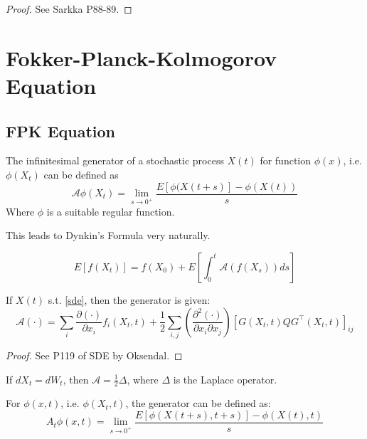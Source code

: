 \begin{proof}
    See Sarkka P88-89.
\end{proof}

\section{Fokker-Planck-Kolmogorov Equation}
\subsection{FPK Equation}
\begin{definition}[Generator]
    The infinitesimal generator of a stochastic process $X(t)$ for function $\phi(x)$, i.e. $\phi(X_t)$ can be defined as
    \begin{equation}
        \mathcal{A} \phi(X_t)=\lim _{s \rightarrow 0^{+}} \frac{E[\phi(X(t+s)]-\phi(X(t))}{s}
    \end{equation}
    Where  $\phi$  is a suitable regular function.
\end{definition}
This leads to Dynkin's Formula very naturally.
\begin{theorem}
    \begin{equation}
        E[f(X_t)]=f(X_0)+E\left[\int_0^t\mathcal{A}(f(X_s))ds\right]
    \end{equation}
\end{theorem}

\begin{theorem}
    If  $X(t)$  s.t. \ref{sde}, then the generator is given:
\begin{equation}
    \mathcal{A}(\cdot)=\sum_{i} \frac{\partial(\cdot)}{\partial x_{i}} f_{i}(X_t, t)+\frac{1}{2} \sum_{i, j}\left(\frac{\partial^{2}(\cdot)}{\partial x_{i} \partial x_{j}}\right)\left[G(X_t, t)Q G^{\top}(X_t, t)\right]_{i j}
\end{equation}
\end{theorem}
\begin{proof}
    See P119 of SDE by Oksendal.
\end{proof}

\begin{example}
    If $dX_t=dW_t$, then $\mathcal{A}=\frac{1}{2}\Delta$, where $\Delta$ is the Laplace operator.
\end{example}

\begin{definition}
    For $\phi(x, t)$, i.e. $\phi(X_t, t)$, the generator can be defined as:
    \begin{equation}
        A_{t} \phi(x, t)=\lim _{s \rightarrow 0^{+}} \frac{E[\phi(X(t+s), t+s)]-\phi(X(t), t)}{s}
    \end{equation}
\end{definition}


